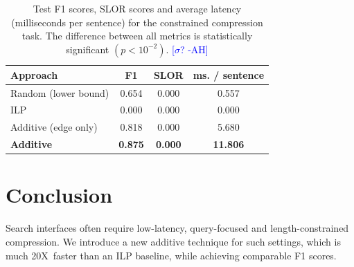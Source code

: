 \documentclass[11pt,a4paper]{article}
\newcommand{\speedup}[0]{20X~}
\newcommand{\ahcomment}[1]{\textcolor{blue}{[#1 -AH]}}
\begin{document}
\begin{table}[]
\begin{tabular}{lccc}
\centering
Approach & F1 & SLOR &  ms. / sentence  \\ \hline
Random {\small (lower bound) }&{\small 0.654}&{\small 0.000}&{\small 0.557}\\
ILP&{\small 0.000}&{\small 0.000}&{\small 0.000}\\
Additive {\small (edge only) }&{\small 0.818}&{\small 0.000}&{\small 5.680}\\
\textbf{Additive}&\textbf{\small 0.875}&\textbf{\small 0.000}&\textbf{\small 11.806}\\
\end{tabular}
\caption{Test F1 scores, SLOR scores and average latency (milliseconds per sentence) for the constrained compression task. 
The difference between all metrics is statistically significant {\small $(p < 10^{-2})$}.
\ahcomment{$\sigma$?}}
\label{t:results}
\end{table}

\section{Conclusion}

Search interfaces often require low-latency, query-focused and length-constrained compression. We introduce a new additive technique for such settings, which is much \speedup faster than an ILP baseline, while achieving comparable F1 scores. 



%



\end{document}
